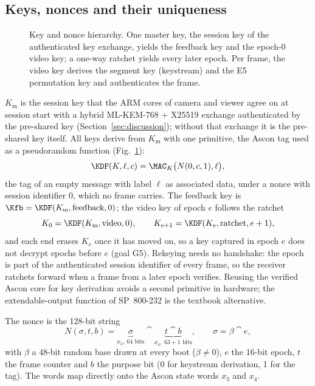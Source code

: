 \subsection{Keys, nonces and their uniqueness}\label{sec:nonce}
\begin{figure}[t]
\centering
\resizebox{0.78\textwidth}{!}{}
\caption{Key and nonce hierarchy. One master key, the session key of the authenticated key exchange, yields the feedback key and the epoch-0 video key; a one-way ratchet yields every later epoch. Per frame, the video key derives the segment key (keystream) and the E5 permutation key and authenticates the frame.}
\label{fig:keys}
\end{figure}
$K_{\mathrm{m}}$ is the session key that the ARM cores of camera and viewer agree on at session start with a hybrid ML-KEM-768 + X25519 exchange authenticated by the pre-shared key (Section~\ref{sec:discussion}); without that exchange it is the pre-shared key itself. All keys derive from $K_{\mathrm{m}}$ with one primitive, the Ascon tag used as a pseudorandom function (Fig.~\ref{fig:keys}):
\begin{equation}
\KDF(K, \ell, c) = \MAC_K\bigl(N(0, c, 1), \ell\bigr),
\label{eq:kdf}
\end{equation}
the tag of an empty message with label $\ell$ as associated data, under a nonce with session identifier $0$, which no frame carries. The feedback key is $\Kfb = \KDF(K_{\mathrm{m}}, \text{feedback}, 0)$; the video key of epoch $e$ follows the ratchet
\begin{equation}
K_0 = \KDF(K_{\mathrm{m}}, \text{video}, 0), \qquad K_{e+1} = \KDF(K_e, \text{ratchet}, e+1),
\label{eq:ratchet}
\end{equation}
and each end erases $K_e$ once it has moved on, so a key captured in epoch $e$ does not decrypt epochs before $e$ (goal G5). Rekeying needs no handshake: the epoch is part of the authenticated session identifier of every frame, so the receiver ratchets forward when a frame from a later epoch verifies. Reusing the verified Ascon core for key derivation avoids a second primitive in hardware; the extendable-output function of SP~800-232 is the textbook alternative.

The nonce is the 128-bit string
\begin{equation}
N(\sigma, t, b) = \underbrace{\sigma}_{x_3,\ 64\text{ bits}} \cat \underbrace{t \cat b}_{x_4,\ 63 + 1\text{ bits}},
\qquad \sigma = \beta \cat e,
\label{eq:nonce}
\end{equation}
with $\beta$ a 48-bit random base drawn at every boot ($\beta \ne 0$), $e$ the 16-bit epoch, $t$ the frame counter and $b$ the purpose bit (0 for keystream derivation, 1 for the tag). The words map directly onto the Ascon state words $x_3$ and $x_4$.


